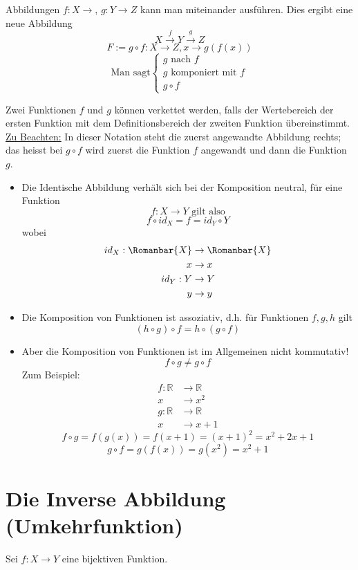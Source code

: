 \begin{definition}
\noindent Abbildungen $f:X\rightarrow $, $g:Y\rightarrow Z$ kann man miteinander ausführen. Dies ergibt eine neue Abbildung \[X\mathop  \to \limits^f Y\mathop  \to \limits^g Z\] \[F:=g\circ f:X\rightarrow Z, x\rightarrow g\left( f(x)\right)   \]
\[\text{Man sagt}
\begin{cases}
g \text{ nach } f \\
g \text{ komponiert mit } f \\
g \circ f
\end{cases}\]
\end{definition}
Zwei Funktionen $f$ und $g$ können verkettet werden, falls der Wertebereich der ersten Funktion mit dem Definitionsbereich der zweiten Funktion übereinstimmt.
\underline{Zu Beachten:}
In dieser Notation steht die zuerst angewandte Abbildung rechts; das heisst bei $g\circ f$ wird zuerst die Funktion $f$ angewandt und dann die Funktion $g$. 
\begin{itemize}
\item Die Identische Abbildung verhält sich bei der Komposition neutral, für eine Funktion \[f:X\rightarrow Y \text{ gilt also}\]
\[f\circ id_X=f=id_Y \circ Y\] wobei
\begin{align*}
id_X:\Romanbar{X}&\rightarrow\Romanbar{X} \\
x&\rightarrow x \\
id_Y :Y&\rightarrow Y \\ 
y&\rightarrow y
\end{align*}

\item Die Komposition von Funktionen ist assoziativ, d.h. für Funktionen $f,g,h$ gilt \[\left( h\circ g\right)\circ f=h\circ \left( g\circ f\right)\]
\item Aber die Komposition von Funktionen ist im Allgemeinen nicht kommutativ! \[f\circ g\not= g\circ f\]
Zum Beispiel:
\begin{align*}
f:\mathbb{R} &\rightarrow\mathbb{R} \\
x &\rightarrow x^2 \\
g:\mathbb{R}&\rightarrow\mathbb{R} \\
x &\rightarrow x+1
\end{align*}
\[f\circ g=f\left( g(x)\right)=f(x+1)=(x+1)^2=x^2+2x+1 \]
\[g\circ f=g\left( f(x)\right)=g(x^2)=x^2+1\]
\end{itemize}

\section{Die Inverse Abbildung (Umkehrfunktion)}
Sei $f:X\rightarrow Y$ eine bijektiven Funktion. \\


